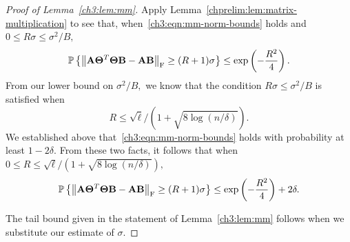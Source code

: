 \begin{proof}[Proof of Lemma~\ref{ch3:lem:mm}]
Apply Lemma~\ref{chprelim:lem:matrix-multiplication} to see that, 
when~\eqref{ch3:eqn:mm-norm-bounds} holds and $0 \leq R \sigma \leq \sigma^2/B,$
\[
 \mathbb{P}\left\{\left\|\mathbf{A} \mathbf{\Theta}^T\mathbf{\Theta} \mathbf{B} - \mathbf{A} \mathbf{B}\right\|_\mathrm{F} \geq (R + 1) \sigma \right\}  \leq \mathrm{exp} \left( -\frac{R^2}{4} \right).
\]
From our lower bound on $\sigma^2/B,$ we know that the condition $R \sigma \leq \sigma^2/B$ is satisfied when
$$R \leq \sqrt{\ell}/(1 + \sqrt{8 \log(n/\delta)}).$$ 
We established above that~\eqref{ch3:eqn:mm-norm-bounds} holds with probability 
at least $1 - 2\delta.$ From these two facts, it follows that when 
$0 \leq R \leq \sqrt{\ell}/(1 + \sqrt{8 \log(n/\delta)}),$
\[
 \mathbb{P}\left\{\left\|\mathbf{A} \mathbf{\Theta}^T\mathbf{\Theta} \mathbf{B} - \mathbf{A} \mathbf{B}\right\|_\mathrm{F} \geq (R + 1) \sigma \right\}  
 \leq \mathrm{exp} \left( -\frac{R^2}{4} \right) + 2 \delta.
\]

The tail bound given in the statement of Lemma~\ref{ch3:lem:mm} follows when 
we substitute our estimate of $\sigma.$
\end{proof}


